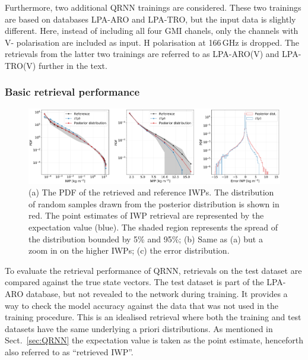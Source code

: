 \documentclass[amt, manuscript]{copernicus}
\begin{document}
Furthermore, two additional QRNN trainings are considered. These two trainings are based on databases LPA-ARO and LPA-TRO, but the input data is slightly different. Here, instead of including all four GMI chanels, only the channels with V- polarisation are included as input. H polarisation at 166\,GHz is dropped.  The retrievals from the latter two trainings are referred to as LPA-ARO(V) and LPA-TRO(V) further in the text. 


\subsubsection{Basic retrieval performance}
%
\label{sec:basic_performance}

\begin{figure}[t]
	\includegraphics[width=12cm]{Figures/PDF_IWP_ARO.pdf}
	\caption{(a) The PDF of the retrieved and reference IWPs. The distribution of random samples drawn from the posterior distribution is shown in red. The point estimates of IWP retrieval are represented by the expectation value (blue). The shaded region represents the spread of the distribution bounded by 5\% and 95\%; (b) Same as (a) but a zoom in on the higher IWPs; (c) the error distribution. }
	\label{fig:PDF_IWP_test}
\end{figure}

To evaluate the  retrieval performance of QRNN, retrievals on the test dataset are compared against the true state vectors. The test dataset is part of the LPA-ARO database, but not revealed to the network during training. It provides a way to check the model accuracy against the data that was not used in the training procedure. This is an idealised retrieval where both the training and test datasets have the same underlying a priori distributions. As mentioned in Sect.~\ref{sec:QRNN} the expectation value is taken as the point estimate, henceforth also referred to as  ``retrieved IWP''.
\end{document}
